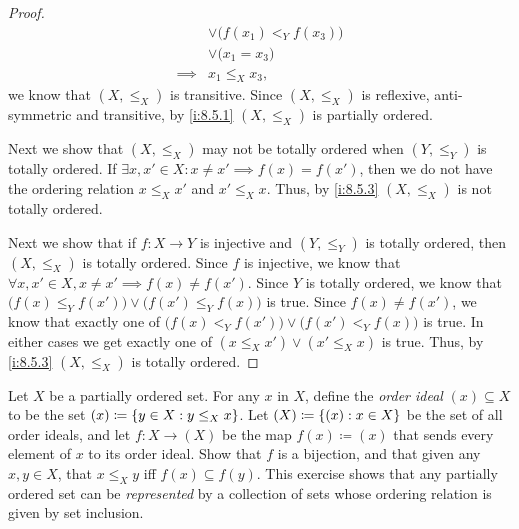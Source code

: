 \begin{proof}
\begin{align*}
             & \lor \big(f(x_1) <_Y f(x_3)\big)                                                                                                    \\
             & \lor \big(x_1 = x_3\big)                                                                                                            \\
    \implies & x_1 \leq_X x_3,
  \end{align*}
  we know that \((X, \leq_X)\) is transitive.
  Since \((X, \leq_X)\) is reflexive, anti-symmetric and transitive, by \cref{i:8.5.1} \((X, \leq_X)\) is partially ordered.

  Next we show that \((X, \leq_X)\) may not be totally ordered when \((Y, \leq_Y)\) is totally ordered.
  If \(\exists x, x' \in X : x \neq x' \implies f(x) = f(x')\), then we do not have the ordering relation \(x \leq_X x'\) and \(x' \leq_X x\).
  Thus, by \cref{i:8.5.3} \((X, \leq_X)\) is not totally ordered.

  Next we show that if \(f : X \to Y\) is injective and \((Y, \leq_Y)\) is totally ordered, then \((X, \leq_X)\) is totally ordered.
  Since \(f\) is injective, we know that \(\forall x, x' \in X, x \neq x' \implies f(x) \neq f(x')\).
  Since \(Y\) is totally ordered, we know that \(\big(f(x) \leq_Y f(x')\big) \lor \big(f(x') \leq_Y f(x)\big)\) is true.
  Since \(f(x) \neq f(x')\), we know that exactly one of \(\big(f(x) <_Y f(x')\big) \lor \big(f(x') <_Y f(x)\big)\) is true.
  In either cases we get exactly one of \((x \leq_X x') \lor (x' \leq_X x)\) is true.
  Thus, by \cref{i:8.5.3} \((X, \leq_X)\) is totally ordered.
\end{proof}

\begin{ex}\label{i:ex:8.5.6}
  Let \(X\) be a partially ordered set.
  For any \(x\) in \(X\), define the \emph{order ideal} \((x) \subseteq X\) to be the set \((x) \coloneqq \left\lbrace y \in X : y \leq_X x\right\rbrace\).
  Let \((X) \coloneqq \left\lbrace(x) : x \in X\right\rbrace\) be the set of all order ideals, and let \(f : X \to (X)\) be the map \(f(x) \coloneqq (x)\) that sends every element of \(x\) to its order ideal.
  Show that \(f\) is a bijection, and that given any \(x, y \in X\), that \(x \leq_X y\) iff \(f(x) \subseteq f(y)\).
  This exercise shows that any partially ordered set can be \emph{represented} by a collection of sets whose ordering relation is given by set inclusion.
\end{ex}

